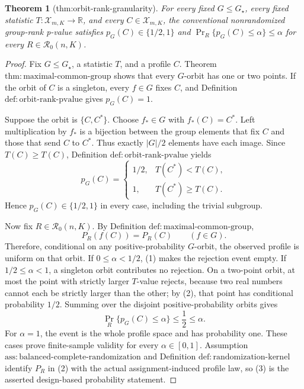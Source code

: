 \documentclass{article}
\newtheorem{theorem}{Theorem}
\begin{document}
\begin{theorem}[thm:orbit-rank-granularity]\label{thm:orbit-rank-granularity}
For every fixed \(G\leq G_\star\), every fixed statistic \(T:\mathcal X_{m,K}\to\mathbb R\), and every \(C\in\mathcal X_{m,K}\), the conventional nonrandomized group-rank p-value satisfies \(p_G(C)\in\{1/2,1\}\) and \(\Pr_R\{p_G(C)\leq\alpha\}\leq\alpha\) for every \(R\in\mathcal R_0(n,K)\).
\end{theorem}
\begin{proof}
Fix \(G\leq G_\star\), a statistic \(T\), and a profile \(C\). Theorem \(\mathrm{thm{:}maximal\text{-}common\text{-}group}\) shows that every \(G\)-orbit has one or two points. If the orbit of \(C\) is a singleton, every \(f\in G\) fixes \(C\), and Definition \(\mathrm{def{:}orbit\text{-}rank\text{-}pvalue}\) gives \(p_G(C)=1\).

Suppose the orbit is \(\{C,C^*\}\). Choose \(f_*\in G\) with \(f_*(C)=C^*\). Left multiplication by \(f_*\) is a bijection between the group elements that fix \(C\) and those that send \(C\) to \(C^*\). Thus exactly \(|G|/2\) elements have each image. Since \(T(C)\geq T(C)\), Definition \(\mathrm{def{:}orbit\text{-}rank\text{-}pvalue}\) yields
\[
 p_G(C)=
 \begin{cases}
 1/2,&T(C^*)<T(C),\\
 1,&T(C^*)\geq T(C).
 \end{cases}
 \tag{1}
\]
Hence \(p_G(C)\in\{1/2,1\}\) in every case, including the trivial subgroup.

Now fix \(R\in\mathcal R_0(n,K)\). By Definition \(\mathrm{def{:}maximal\text{-}common\text{-}group}\),
\[
 P_R(f(C))=P_R(C)\qquad(f\in G).
 \tag{2}
\]
Therefore, conditional on any positive-probability \(G\)-orbit, the observed profile is uniform on that orbit. If \(0\leq\alpha<1/2\), (1) makes the rejection event empty. If \(1/2\leq\alpha<1\), a singleton orbit contributes no rejection. On a two-point orbit, at most the point with strictly larger \(T\)-value rejects, because two real numbers cannot each be strictly larger than the other; by (2), that point has conditional probability \(1/2\). Summing over the disjoint positive-probability orbits gives
\[
 \Pr_R\{p_G(C)\leq\alpha\}\leq\frac12\leq\alpha.
 \tag{3}
\]
For \(\alpha=1\), the event is the whole profile space and has probability one. These cases prove finite-sample validity for every \(\alpha\in[0,1]\). Assumption \(\mathrm{ass{:}balanced\text{-}complete\text{-}randomization}\) and Definition \(\mathrm{def{:}randomization\text{-}kernel}\) identify \(P_R\) in (2) with the actual assignment-induced profile law, so (3) is the asserted design-based probability statement.
\end{proof}
\end{document}

